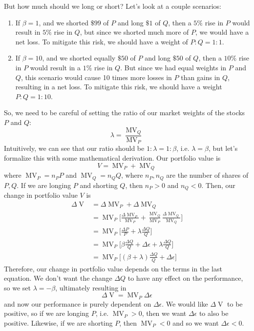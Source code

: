 \documentclass{article}
\DeclareMathOperator{\MV}{MV}
\DeclareMathOperator{\V}{V}
\begin{document}
    But how much should we long or short? Let's look at a couple scenarios: 
    \begin{enumerate}
        \item If $\beta = 1$, and we shorted $\$99$ of $P$ and long $\$1$ of $Q$, then a $5\%$ rise in $P$ would result in $5\%$ rise in $Q$, but since we shorted much more of $P$, we would have a net loss. To mitigate this risk, we should have a weight of $P:Q = 1:1$. 
        \item If $\beta = 10$, and we shorted equally $\$50$ of $P$ and long $\$50$ of $Q$, then a $10\%$ rise in $P$ would result in a $1\%$ rise in $Q$. But since we had equal weights in $P$ and $Q$, this scenario would cause 10 times more losses in $P$ than gains in $Q$, resulting in a net loss. To mitigate this risk, we should have a weight $P:Q = 1:10$. 
    \end{enumerate}
    So, we need to be careful of setting the ratio of our market weights of the stocks $P$ and $Q$: 
    \[\lambda = \frac{\MV_Q}{\MV_P}\]
    Intuitively, we can see that our ratio should be $1: \lambda = 1:\beta$, i.e. $\lambda = \beta$, but let's formalize this with some mathematical derivation. Our portfolio value is 
    \[V = \MV_P + \MV_Q\]
    where $\MV_P = n_P P$ and $\MV_Q = n_Q Q$, where $n_P, n_Q$ are the number of shares of $P, Q$. If we are longing $P$ and shorting $Q$, then $n_P > 0$ and $n_Q < 0$. Then, our change in portfolio value $V$ is 
    \begin{align*}
        \Delta \V & = \Delta \MV_P + \Delta \MV_Q \\
        & = \MV_P \bigg[\frac{\Delta \MV_P}{\MV_P} + \frac{\MV_Q}{\MV_P} \frac{\Delta \MV_Q}{\MV_Q}  \bigg] \\
        & = \MV_P \bigg[ \frac{\Delta P}{P} + \lambda \frac{\Delta Q}{Q} \bigg] \\
        & = \MV_P \bigg[ \beta \frac{\Delta Q}{Q} + \Delta \epsilon + \lambda \frac{\Delta Q}{Q} \bigg] \\
        & = \MV_P \bigg[ (\beta + \lambda) \frac{\Delta Q}{Q} + \Delta \epsilon \bigg] 
    \end{align*}
    Therefore, our change in portfolio value depends on the terms in the last equation. We don't want the change $\Delta Q$ to have any effect on the performance, so we set $\lambda = - \beta$, ultimately resulting in 
    \[\Delta \V = \MV_P \Delta \epsilon\]
    and now our performance is purely dependent on $\Delta \epsilon$. We would like $\Delta \V$ to be positive, so if we are longing $P$, i.e. $\MV_P > 0$, then we want $\Delta \epsilon$ to also be positive. Likewise, if we are shorting $P$, then $\MV_P < 0$ and so we want $\Delta \epsilon < 0$. 
\end{document}
